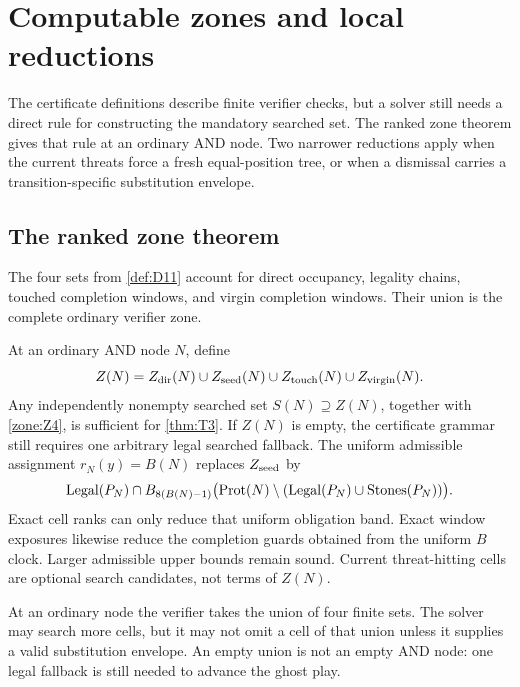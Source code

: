 \section{Computable zones and local reductions}
\label{sec:computable-zones}

The certificate definitions describe finite verifier checks, but a solver
still needs a direct rule for constructing the mandatory searched set.  The
ranked zone theorem gives that rule at an ordinary AND node.  Two narrower
reductions apply when the current threats force a fresh equal-position tree,
or when a dismissal carries a transition-specific substitution envelope.

\subsection{The ranked zone theorem}

The four sets from \cref{def:D11} account for direct occupancy, legality
chains, touched completion windows, and virgin completion windows.  Their
union is the complete ordinary verifier zone.

\begin{theorem}
\label{thm:T4}
\upshape
At an ordinary AND node $N$, define
\[
 Z(N)=Z_{\mathrm{dir}}(N)\cup Z_{\mathrm{seed}}(N)\cup Z_{\mathrm{touch}}(N)\cup Z_{\mathrm{virgin}}(N).
\]
Any independently nonempty searched set $S(N)\supseteq Z(N)$, together with
\cref{zone:Z4}, is sufficient for \cref{thm:T3}.  If $Z(N)$ is empty, the
certificate grammar still requires one arbitrary legal searched fallback.
The uniform admissible assignment $r_N(y)=B(N)$ replaces $Z_{\mathrm{seed}}$ by
\[
 \operatorname{Legal}(P_N)\cap B_{8(B(N)-1)}
 \bigl(\operatorname{Prot}(N)\setminus(\operatorname{Legal}(P_N)\cup\operatorname{Stones}(P_N))\bigr).
\]
Exact cell ranks can only reduce that uniform obligation band.  Exact window
exposures likewise reduce the completion guards obtained from the uniform
$B$ clock.  Larger admissible upper bounds remain sound.  Current
threat-hitting cells are optional search candidates, not terms of $Z(N)$.
\end{theorem}

\begin{plainterms}
At an ordinary node the verifier takes the union of four finite sets.  The
solver may search more cells, but it may not omit a cell of that union unless
it supplies a valid substitution envelope.  An empty union is not an empty
AND node: one legal fallback is still needed to advance the ghost play.
\end{plainterms}

